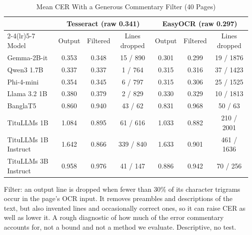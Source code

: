 \begin{table}[t]
\centering
\caption{Mean CER With a Generous Commentary Filter (40 Pages)}
\label{tab:filter}
\setlength{\tabcolsep}{5pt}
\footnotesize
\begin{tabular}{lcccccc}
\toprule
 & \multicolumn{3}{c}{Tesseract (raw 0.341)} & \multicolumn{3}{c}{EasyOCR (raw 0.297)} \\
\cmidrule(lr){2-4}\cmidrule(lr){5-7}
Model & Output & Filtered & Lines dropped & Output & Filtered & Lines dropped \\
\midrule
Gemma-2B-it & 0.353 & 0.348 & 15 / 890 & 0.301 & 0.299 & 19 / 1876 \\
Qwen3 1.7B & 0.337 & 0.337 & 1 / 764 & 0.315 & 0.316 & 37 / 1423 \\
Phi-4-mini & 0.354 & 0.345 & 6 / 797 & 0.315 & 0.306 & 25 / 1525 \\
Llama 3.2 1B & 0.380 & 0.379 & 2 / 829 & 0.330 & 0.329 & 10 / 1813 \\
BanglaT5 & 0.860 & 0.940 & 43 / 62 & 0.831 & 0.968 & 50 / 63 \\
TituLLMs 1B & 1.084 & 0.895 & 61 / 616 & 1.033 & 0.882 & 210 / 2001 \\
TituLLMs 1B Instruct & 1.642 & 0.866 & 339 / 840 & 1.633 & 0.901 & 461 / 1636 \\
TituLLMs 3B Instruct & 0.958 & 0.976 & 41 / 147 & 0.886 & 0.942 & 70 / 256 \\
\bottomrule
\end{tabular}
\par\smallskip
\begin{minipage}{\linewidth}\footnotesize Filter: an output line is dropped when fewer than 30\% of its character trigrams occur in the page's OCR input. It removes preambles and descriptions of the text, but also invented lines and occasionally correct ones, so it can raise CER as well as lower it. A rough diagnostic of how much of the error commentary accounts for, not a bound and not a method we evaluate. Descriptive, no test.\end{minipage}
\end{table}
